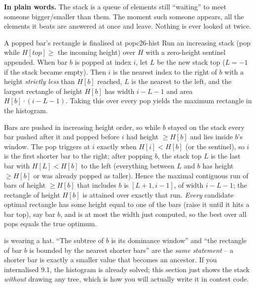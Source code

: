\noindent\textbf{In plain words.} The stack is a queue of elements still ``waiting'' to meet someone
bigger/smaller than them. The moment such someone appears, all the elements it beats are answered at
once and leave. Nothing is ever looked at twice.

\begin{theorem}{A popped bar's rectangle is finalised at pop}{c26-hist}
Run an increasing stack (pop while $H[\mathit{top}] \ge$ the incoming height) over $H$ with a
zero-height sentinel appended. When bar $b$ is popped at index $i$, let $L$ be the new stack top
($L=-1$ if the stack became empty). Then $i$ is the nearest index to the right of $b$ with a height
\emph{strictly less} than $H[b]$ reached, $L$ is the nearest to the left, and the largest rectangle of
height $H[b]$ has width $i - L - 1$ and area $H[b]\cdot(i-L-1)$. Taking this over every pop yields the
maximum rectangle in the histogram.
\end{theorem}
\begin{proofbox}
Bars are pushed in increasing height order, so while $b$ stayed on the stack every bar pushed after it
and popped before $i$ had height $\ge H[b]$ and lies inside $b$'s window. The pop triggers at $i$ exactly
when $H[i] < H[b]$ (or the sentinel), so $i$ is the first shorter bar to the right; after popping $b$,
the stack top $L$ is the last bar with $H[L] < H[b]$ to the left (everything between $L$ and $b$ has
height $\ge H[b]$ or was already popped as taller). Hence the maximal contiguous run of bars of height
$\ge H[b]$ that includes $b$ is $[L+1, i-1]$, of width $i-L-1$; the rectangle of height $H[b]$ is
attained over exactly that run. \emph{Every} candidate optimal rectangle has some height equal to one of
the bars (raise it until it hits a bar top), say bar $b$, and is at most the width just computed, so the
best over all pops equals the true optimum. \end{proofbox}

\begin{insightbox}
 is  wearing a hat. ``The subtree of $b$ is its dominance window'' and
``the rectangle of bar $b$ is bounded by the nearest shorter bars'' are the \emph{same statement} -- a
shorter bar is exactly a smaller value that becomes an ancestor. If you internalised 9.1, the histogram
is already solved; this section just shows the stack \emph{without} drawing any tree, which is how you
will actually write it in contest code.
\end{insightbox}

